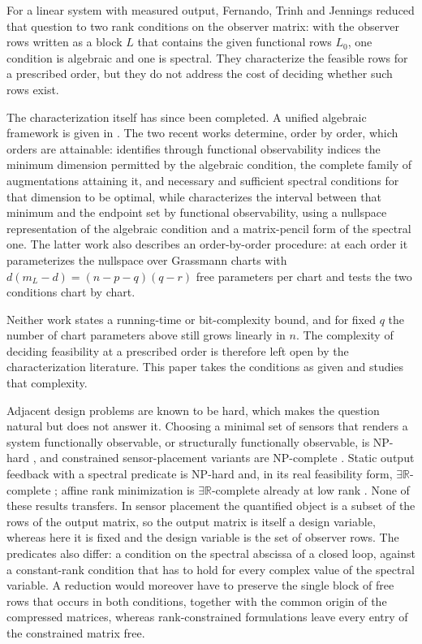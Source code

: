 \documentclass[journal]{IEEEtran}
\theoremstyle{plainn}
\theoremstyle{remark}
\begin{document}
For a linear system with measured output, Fernando, Trinh and Jennings \cite{fer10}
reduced that question to two rank conditions on the observer matrix: with the observer
rows written as a block $L$ that contains the given functional rows $L_0$, one condition
is algebraic and one is spectral. They characterize the feasible rows for a prescribed
order, but they do not address the cost of deciding whether such rows exist.

The characterization itself has since been completed. A unified algebraic framework is
given in \cite{dar25}. The two recent works \cite{fer26a,fer26b} determine, order by
order, which orders are attainable: \cite{fer26a} identifies through functional
observability indices the minimum dimension permitted by the algebraic condition, the
complete family of augmentations attaining it, and necessary and sufficient spectral
conditions for that dimension to be optimal, while \cite{fer26b} characterizes the
interval between that minimum and the endpoint set by functional observability, using a
nullspace representation of the algebraic condition and a matrix-pencil form of the
spectral one. The latter work also describes an order-by-order procedure: at each order
it parameterizes the nullspace over Grassmann charts with $d(m_L-d)=(n-p-q)(q-r)$ free
parameters per chart and tests the two conditions chart by chart.

Neither work states a running-time or bit-complexity bound, and for fixed $q$ the number
of chart parameters above still grows linearly in $n$. The complexity of deciding
feasibility at a prescribed order is therefore left open by the characterization
literature. This paper takes the conditions as given and studies that complexity.

Adjacent design problems are known to be hard, which makes the question natural but does
not answer it. Choosing a minimal set of sensors that renders a system functionally
observable, or structurally functionally observable, is NP-hard \cite{zha25}, and
constrained sensor-placement variants are NP-complete \cite{dey21}. Static output
feedback with a spectral predicate is NP-hard \cite{lof26,bar26} and, in its real
feasibility form, $\exists\mathbb R$-complete \cite{liu26}; affine rank minimization is
$\exists\mathbb R$-complete already at low rank \cite{maj26}. None of these results
transfers. In sensor placement the quantified object is a subset of the rows of the
output matrix, so the output matrix is itself a design variable, whereas here it is fixed
and the design variable is the set of observer rows. The predicates also differ: a
condition on the spectral abscissa of a closed loop, against a constant-rank condition
that has to hold for every complex value of the spectral variable. A reduction would
moreover have to preserve the single block of free rows that occurs in both conditions,
together with the common origin of the compressed matrices, whereas rank-constrained
formulations leave every entry of the constrained matrix free.
\end{document}
